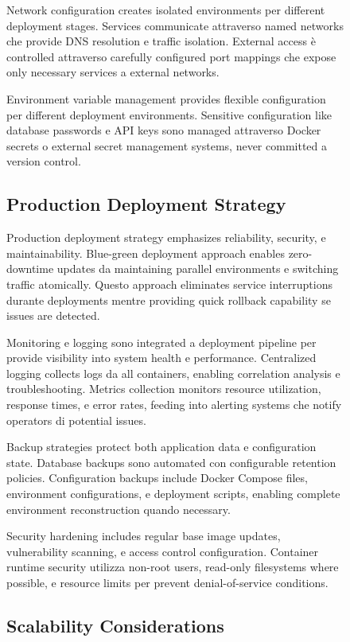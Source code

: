 \documentclass[12pt,a4paper]{article}
\begin{document}
\begin{figure}[H]
Network configuration creates isolated environments per different deployment stages. Services communicate attraverso named networks che provide DNS resolution e traffic isolation. External access è controlled attraverso carefully configured port mappings che expose only necessary services a external networks.

Environment variable management provides flexible configuration per different deployment environments. Sensitive configuration like database passwords e API keys sono managed attraverso Docker secrets o external secret management systems, never committed a version control.

\subsection{Production Deployment Strategy}

Production deployment strategy emphasizes reliability, security, e maintainability. Blue-green deployment approach enables zero-downtime updates da maintaining parallel environments e switching traffic atomically. Questo approach eliminates service interruptions durante deployments mentre providing quick rollback capability se issues are detected.

Monitoring e logging sono integrated a deployment pipeline per provide visibility into system health e performance. Centralized logging collects logs da all containers, enabling correlation analysis e troubleshooting. Metrics collection monitors resource utilization, response times, e error rates, feeding into alerting systems che notify operators di potential issues.

Backup strategies protect both application data e configuration state. Database backups sono automated con configurable retention policies. Configuration backups include Docker Compose files, environment configurations, e deployment scripts, enabling complete environment reconstruction quando necessary.

Security hardening includes regular base image updates, vulnerability scanning, e access control configuration. Container runtime security utilizza non-root users, read-only filesystems where possible, e resource limits per prevent denial-of-service conditions.

\subsection{Scalability Considerations}


\end{figure}
\end{document}
